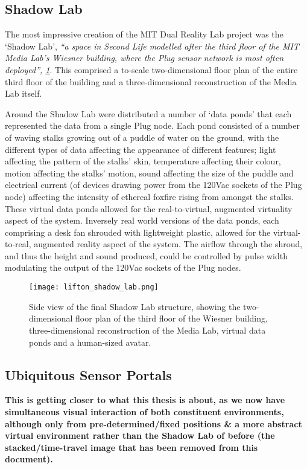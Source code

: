 \subsection{Shadow Lab}
\label{subsec:mit_shadow_lab}
The most impressive creation of the MIT Dual Reality Lab project was the `Shadow Lab', \textit{``a space in Second Life modelled after the third floor of the MIT Media Lab's Wiesner building, where the Plug sensor network is most often deployed'', \ref{lifton_shadow_lab.png}}. This comprised a to-scale two-dimensional floor plan of the entire third floor of the building and a three-dimensional reconstruction of the Media Lab itself.

Around the Shadow Lab were distributed a number of `data ponds' that each represented the data from a single Plug node. Each pond consisted of a number of waving stalks growing out of a puddle of water on the ground, with the different types of data affecting the appearance of different features; light affecting the pattern of the stalks' skin, temperature affecting their colour, motion affecting the stalks' motion, sound affecting the size of the puddle and electrical current (of devices drawing power from the 120Vac sockets of the Plug node) affecting the intensity of ethereal foxfire rising from amongst the stalks. These virtual data ponds allowed for the real-to-virtual, augmented virtuality aspect of the system. Inversely real world versions of the data ponds, each comprising a desk fan shrouded with lightweight plastic, allowed for the virtual-to-real, augmented reality aspect of the system. The airflow through the shroud, and thus the height and sound produced, could be controlled by pulse width modulating the output of the 120Vac sockets of the Plug nodes.

\begin{figure}[h]
\centering
\texttt{[image: lifton\_shadow\_lab.png]}
\caption{Side view of the final Shadow Lab structure, showing the two-dimensional floor plan of the third floor of the Wiesner building, three-dimensional reconstruction of the Media Lab, virtual data ponds and a human-sized avatar.}
\label{lifton_shadow_lab.png}
\end{figure}

\subsection{Ubiquitous Sensor Portals}

\textbf{This is getting closer to what this thesis is about, as we now have simultaneous visual interaction of both constituent environments, although only from pre-determined/fixed positions \& a more abstract virtual environment rather than the Shadow Lab of before (the stacked/time-travel image that has been removed from this document).}

